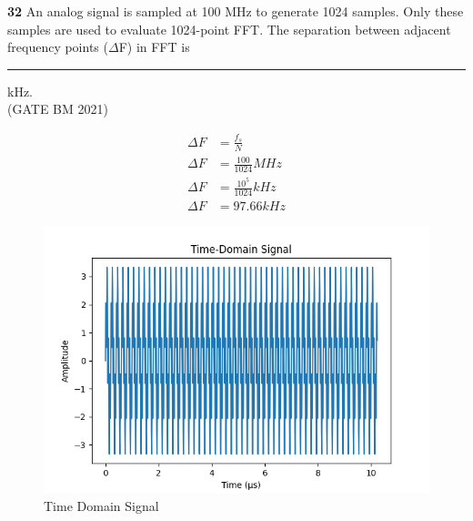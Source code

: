 \documentclass[journal,12pt,twocolumn]{IEEEtran}
\begin{document}


\vspace{3cm}

\title{}
\author{EE23BTECH11047 - Deepakreddy P
}
\maketitle
\newpage
\bigskip

\noindent \textbf{32} \quad An analog signal is sampled at 100 MHz to generate 1024 samples. Only
these samples are used to evaluate 1024-point FFT. The separation between
adjacent frequency points ($\Delta$F) in FFT is \rule{1cm}{0.5mm} kHz.\\
\hfill (GATE BM 2021)\\
\solution

\begin{center}
    \begin{table}[ht]
        
    \end{table}
\end{center}

\begin{align}
    \Delta F &= \frac{f_s}{N}\\
    \Delta F &= \frac{100}{1024} MHz\\
    \Delta F &= \frac{10^5}{1024} kHz\\
    \Delta F &= 97.66kHz
\end{align}


\begin{figure}[ht]
   \centering
   \includegraphics[width=1.1\columnwidth]{figs/fig1.png}
   \caption{Time Domain Signal}
\end{figure}
\end{document}
